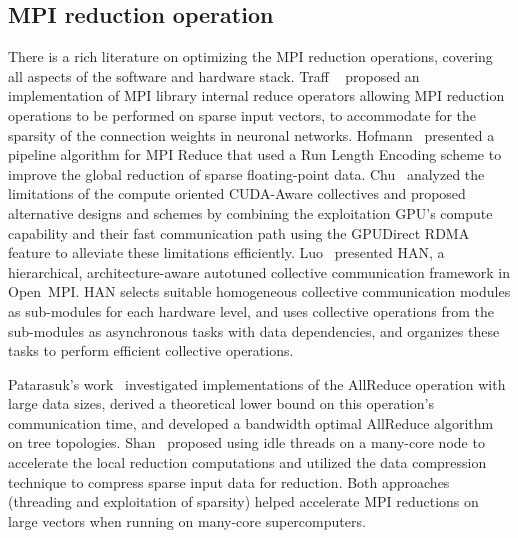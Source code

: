 \documentclass[5p,times,twocolumn]{elsarticle}
\newcommand{\ompi}[0]{Open~MPI\xspace}
\newcommand{\mpi}[0]{\textsc{MPI}\xspace}
\newcommand{\allreduce}[0]{AllReduce\xspace}
\begin{document}
\subsection{\mpi reduction operation}
There is a rich literature on optimizing the \mpi reduction operations, covering all aspects of the software and hardware stack. Traff
~\cite{NeutralMPIReduction} proposed an implementation of MPI library
internal reduce operators allowing MPI reduction operations to be performed on sparse input vectors, to accommodate for the sparsity of the connection weights in neuronal networks.
%
Hofmann~\cite{sparse-reduction} presented a pipeline algorithm for MPI Reduce
that used a Run Length Encoding scheme to improve the global reduction of sparse
floating-point data.
%
Chu~\cite{gpu-reduce} analyzed the limitations of the compute oriented CUDA-Aware
collectives and proposed alternative designs and schemes by combining the exploitation GPU's
compute capability and their fast communication
path using the GPUDirect RDMA feature to alleviate these limitations efficiently.
%
Luo~\cite{luo-han} presented HAN, a hierarchical, architecture-aware autotuned collective communication
framework in \ompi. HAN selects suitable homogeneous collective communication
modules as sub-modules for each hardware level, and uses collective operations from
the sub-modules as asynchronous tasks with data dependencies, and organizes these tasks to perform efficient collective operations.
%

Patarasuk's work~\cite{allreduce-optimal} investigated implementations of the \allreduce operation
with large data sizes, derived a theoretical lower bound on this operation's communication time, and developed
a bandwidth optimal \allreduce algorithm on tree topologies.
%
Shan~\cite{shan-reduce} proposed using idle threads on a many-core node to accelerate
the local reduction computations and utilized the data compression technique to compress sparse input data for reduction.
Both approaches (threading and exploitation
of sparsity) helped accelerate MPI reductions on large vectors when
running on many-core supercomputers.
%
\end{document}
